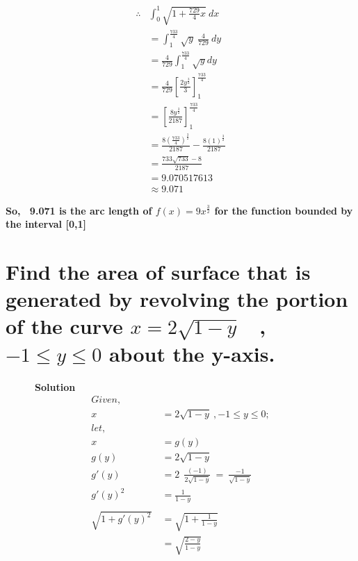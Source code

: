 \documentclass[12pt]{article}
\begin{document}
\begin{align*}
    \therefore & \int_{0}^{1} \sqrt{1+ \frac{729}{4}x} \ dx\\
    & =  \int_{1}^{\frac{733}{4}} \sqrt{y} \ \frac{4}{729} \ dy \\
    & = \frac{4}{729} \int_{1}^{\frac{733}{4}} \sqrt{y} dy \\
    & = \frac{4}{729} \left [ \frac{2y^\frac{3}{2}}{3} \right ]_{1}^{\frac{733}{4}}\\
    & = \left[ \frac{8y^\frac{3}{2}}{2187}\right]_{1}^{\frac{733}{4}}\\
    & =  \frac{8(\frac{733}{4})^\frac{3}{2}}{2187}- \frac{8(1)^\frac{3}{2}}{2187}\\
    & = \frac{733\sqrt{733}-8}{2187}\\
    & = 9.070517613\\
    & \approx 9.071
\end{align*}

\bigskip
\bigskip
\bigskip

\textbf{So, \ 9.071 is the arc length of $f(x)= 9x^\frac{3}{2}$ for the function bounded by the interval [0,1]}

\pagebreak


\section{Find the area of surface that is generated by revolving the portion of the curve $x=2\sqrt{1-y}$ \ , $-1\leq y \leq 0$ about the y-axis.}

\ \ \ \ \ \ \textbf{\large Solution}
\begin{align*}
    Given, \\
    x&=2\sqrt{1-y} \ ,-1\leq y \leq 0; \\
    let,\\
    x&= g(y)\\
    g(y) &= 2 \sqrt{1-y}\\
    g{'}(y) &= 2 \ \ \frac{(-1)}{2\sqrt{1-y}} \ =\  \frac{-1}{\sqrt{1-y}}\\
    g{'}(y)^2 &= \frac{1}{1-y}\\\\
    \sqrt{1+g{'}(y)^2} \ &= \sqrt{1+ \frac{1}{1-y}}\\
                        &= \sqrt{\frac{2-y}{1-y}}
\end{align*}
    
\end{document}

